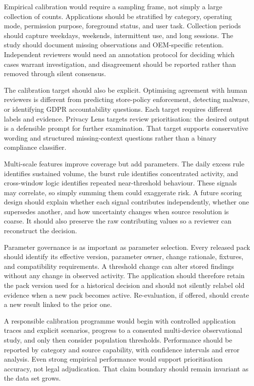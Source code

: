 Empirical calibration would require a sampling frame, not simply a large collection of counts. Applications should be stratified by category, operating mode, permission purpose, foreground status, and user task. Collection periods should capture weekdays, weekends, intermittent use, and long sessions. The study should document missing observations and OEM-specific retention. Independent reviewers would need an annotation protocol for deciding which cases warrant investigation, and disagreement should be reported rather than removed through silent consensus.

The calibration target should also be explicit. Optimising agreement with human reviewers is different from predicting store-policy enforcement, detecting malware, or identifying GDPR accountability questions. Each target requires different labels and evidence. Privacy Lens targets review prioritisation: the desired output is a defensible prompt for further examination. That target supports conservative wording and structured missing-context questions rather than a binary compliance classifier.

Multi-scale features improve coverage but add parameters. The daily excess rule identifies sustained volume, the burst rule identifies concentrated activity, and cross-window logic identifies repeated near-threshold behaviour. These signals may correlate, so simply summing them could exaggerate risk. A future scoring design should explain whether each signal contributes independently, whether one supersedes another, and how uncertainty changes when source resolution is coarse. It should also preserve the raw contributing values so a reviewer can reconstruct the decision.

Parameter governance is as important as parameter selection. Every released pack should identify its effective version, parameter owner, change rationale, fixtures, and compatibility requirements. A threshold change can alter stored findings without any change in observed activity. The application should therefore retain the pack version used for a historical decision and should not silently relabel old evidence when a new pack becomes active. Re-evaluation, if offered, should create a new result linked to the prior one.

A responsible calibration programme would begin with controlled application traces and explicit scenarios, progress to a consented multi-device observational study, and only then consider population thresholds. Performance should be reported by category and source capability, with confidence intervals and error analysis. Even strong empirical performance would support prioritisation accuracy, not legal adjudication. That claim boundary should remain invariant as the data set grows.

